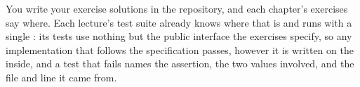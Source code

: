 \noindent You write your exercise solutions in the repository, and each chapter's exercises say
where. Each lecture's test suite already knows where that is and runs with a single :
its tests use nothing but the public interface the exercises specify, so any implementation that
follows the specification passes, however it is written on the inside, and a test that fails names
the assertion, the two values involved, and the file and line it came from.
